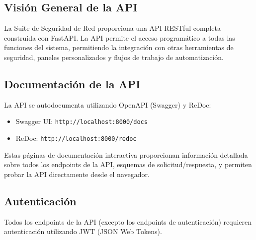 \subsection{Visión General de la API}
La Suite de Seguridad de Red proporciona una API RESTful completa construida con FastAPI. La API permite el acceso programático a todas las funciones del sistema, permitiendo la integración con otras herramientas de seguridad, paneles personalizados y flujos de trabajo de automatización.

\subsection{Documentación de la API}
La API se autodocumenta utilizando OpenAPI (Swagger) y ReDoc:

\begin{itemize}
    \item Swagger UI: \texttt{http://localhost:8000/docs}
    \item ReDoc: \texttt{http://localhost:8000/redoc}
\end{itemize}

Estas páginas de documentación interactiva proporcionan información detallada sobre todos los endpoints de la API, esquemas de solicitud/respuesta, y permiten probar la API directamente desde el navegador.

\subsection{Autenticación}
Todos los endpoints de la API (excepto los endpoints de autenticación) requieren autenticación utilizando JWT (JSON Web Tokens).

